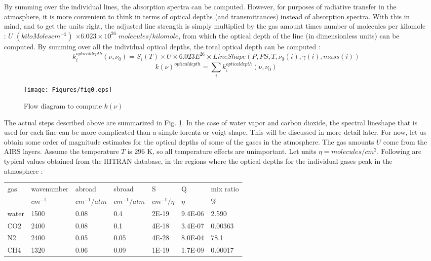 \documentclass[11pt]{article}
\begin{document}
By summing over the individual lines, the absorption spectra can be 
computed. However, for purposes of radiative transfer in the atmosphere, 
it is more convenient to think in terms of optical depths (and 
transmittances) instead of absorption spectra. With this in mind, and to 
get the units right, the adjusted line strength is simply multiplied by 
the gas amount times number of molecules per kilomole : 
$U$ $(kiloMolescm^{-2})$ $ \times 6.023 \times 10^{26}$ 
$molecules/kilomole$, from which the optical depth of the line 
(in dimensionless units) can be computed. By summing over all the 
individual optical depths, the total optical depth can be computed : 
\[
k_{i}^{optical depth}(\nu,\nu_{0}) = S_{i}(T) \times U 
\times 6.023E^{26} \times LineShape(P, PS, T, \nu_{0}(i), \gamma(i), mass(i))
\]
\[ 
k(\nu)^{optical depth} = \sum_{i} k_{i}^{optical depth}(\nu,\nu_{0})
\] 

\begin{figure}[h]
  \begin{center}\texttt{[image: Figures/fig0.eps]}\end{center}
  \caption[Computing absorption spectra]{Flow diagram to compute $k(\nu)$}
  \label{fig:easy}
\end{figure}

The actual steps described above are summarized in Fig. \ref{fig:easy}. 
In the case of 
water vapor  and carbon dioxide, the spectral lineshape that is used for 
each line can be more complicated than a simple lorentz or voigt shape. 
This will be discussed in more detail later. For now, let us obtain some 
order of magnitude estimates for the optical depths of some of the gases 
in the atmosphere. The gas amounts $U$ come from the AIRS layers. Assume 
the temperature $T$ is 296 K, so all temperature effects are unimportant. 
Let units $\eta = molecules/cm^{2}$. Following are typical values obtained 
from the HITRAN database, in the regions where the optical depths for the 
individual gases peak in the atmosphere : 

\begin{longtable}{lllllll} 
gas & wavenumber & abroad         & sbroad       & S & Q & mix ratio \\
   & $cm^{-1}$  & $cm^{-1}/atm$ & $cm^{-1}/atm$ &$cm^{-1}/\eta$ & $\eta$ &\%\\ 
\hline
water & 1500 & 0.08 & 0.4  & 2E-19 & 9.4E-06 & 2.590\\
CO2   & 2400 & 0.08 & 0.1  & 4E-18 & 3.4E-07 & 0.00363\\
N2    & 2400 & 0.05 & 0.05 & 4E-28 & 8.0E-04 & 78.1\\
CH4   & 1320 & 0.06 & 0.09 & 1E-19 & 1.7E-09 & 0.00017\\
\hline
\end{longtable} 
 
\end{document}

